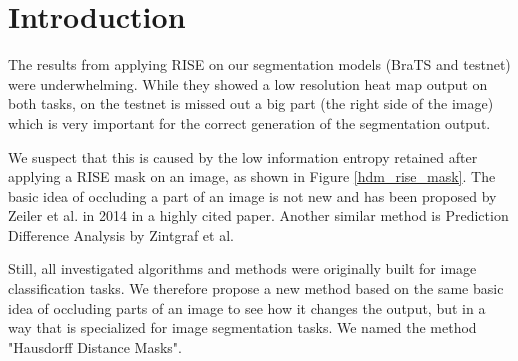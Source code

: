 \section{Introduction}

The results from applying RISE on our segmentation models (BraTS and testnet) were underwhelming. While they showed a low resolution heat map output on both tasks,
on the testnet is missed out a big part (the right side of the image) which is very important for the correct generation of the segmentation output.

We suspect that this is caused by the low information entropy retained after applying a RISE mask on an image, as shown in Figure \ref{hdm_rise_mask}.
The basic idea of occluding a part of an image is not new and has been proposed by Zeiler et al. in 2014 \cite{zeiler2014visualizing} in a highly cited paper.
Another similar method is Prediction Difference Analysis \cite{zintgraf2017visualizing} by Zintgraf et al.

Still, all investigated algorithms and methods were originally built for image classification tasks. We therefore propose a new method based on the same basic idea
of occluding parts of an image to see how it changes the output, but in a way that is specialized for image segmentation tasks. We named the method "Hausdorff Distance Masks".

